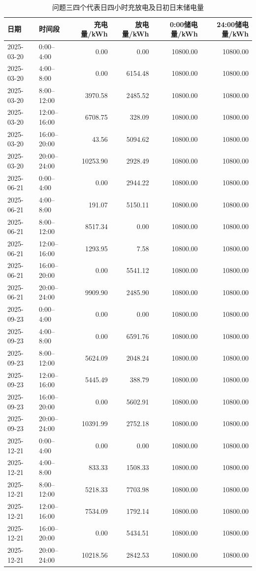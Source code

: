 \documentclass[UTF8,12pt,a4paper]{ctexart}
\theoremstyle{remark}
\begin{document}
\begin{table}[htbp]\centering\scriptsize
\caption{问题三四个代表日四小时充放电及日初日末储电量}\label{tab:q3-blocks}
\begin{tabular}{llrrrr}\toprule 日期&时间段&充电量/kWh&放电量/kWh&0:00储电量/kWh&24:00储电量/kWh\\\midrule
2025-03-20&0:00--4:00&0.00&0.00&10800.00&10800.00\\
2025-03-20&4:00--8:00&0.00&6154.48&10800.00&10800.00\\
2025-03-20&8:00--12:00&3970.58&2485.52&10800.00&10800.00\\
2025-03-20&12:00--16:00&6708.75&328.09&10800.00&10800.00\\
2025-03-20&16:00--20:00&43.56&5094.62&10800.00&10800.00\\
2025-03-20&20:00--24:00&10253.90&2928.49&10800.00&10800.00\\
2025-06-21&0:00--4:00&0.00&2944.22&10800.00&10800.00\\
2025-06-21&4:00--8:00&191.07&5150.11&10800.00&10800.00\\
2025-06-21&8:00--12:00&8517.34&0.00&10800.00&10800.00\\
2025-06-21&12:00--16:00&1293.95&7.58&10800.00&10800.00\\
2025-06-21&16:00--20:00&0.00&5541.12&10800.00&10800.00\\
2025-06-21&20:00--24:00&9909.90&2485.90&10800.00&10800.00\\
2025-09-23&0:00--4:00&0.00&0.00&10800.00&10800.00\\
2025-09-23&4:00--8:00&0.00&6591.76&10800.00&10800.00\\
2025-09-23&8:00--12:00&5624.09&2048.24&10800.00&10800.00\\
2025-09-23&12:00--16:00&5445.49&388.79&10800.00&10800.00\\
2025-09-23&16:00--20:00&0.00&5602.91&10800.00&10800.00\\
2025-09-23&20:00--24:00&10391.99&2752.18&10800.00&10800.00\\
2025-12-21&0:00--4:00&0.00&0.00&10800.00&10800.00\\
2025-12-21&4:00--8:00&833.33&1508.33&10800.00&10800.00\\
2025-12-21&8:00--12:00&5218.33&7703.98&10800.00&10800.00\\
2025-12-21&12:00--16:00&7534.09&1792.14&10800.00&10800.00\\
2025-12-21&16:00--20:00&0.00&5434.51&10800.00&10800.00\\
2025-12-21&20:00--24:00&10218.56&2842.53&10800.00&10800.00\\\bottomrule
\end{tabular}\end{table}
\end{document}
